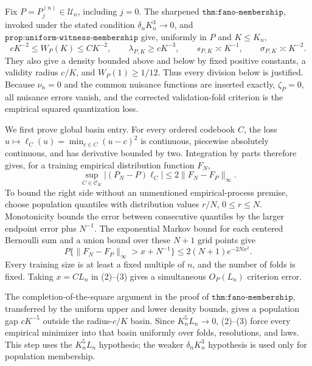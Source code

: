 Fix \(P=P_j^{(n)}\in\mathcal U_n\), including \(j=0\).  The sharpened \(\texttt{thm:fano-membership}\), invoked under the stated condition \(\delta_nK_n^3\to0\), and \(\texttt{prop:uniform-witness-membership}\) give, uniformly in \(P\) and \(K\leq K_n\),
\[
 cK^{-2}\leq W_P(K)\leq CK^{-2},\qquad
 \lambda_{P,K}\geq cK^{-3},\qquad s_{P,K}\asymp K^{-1},
 \qquad \sigma_{P,K}\asymp K^{-2}.                                                       \tag{1}
\]
They also give a density bounded above and below by fixed positive constants, a validity radius \(c/K\), and \(W_P(1)\geq1/12\).  Thus every division below is justified.  Because \(\nu_n=0\) and the common nuisance functions are inserted exactly, \(\zeta_P=0\), all nuisance errors vanish, and the corrected validation-fold criterion is the empirical squared quantization loss.

We first prove global basin entry.  For every ordered codebook \(C\), the loss \(u\mapsto\ell_C(u)=\min_{c\in C}(u-c)^2\) is continuous, piecewise absolutely continuous, and has derivative bounded by two.  Integration by parts therefore gives, for a training empirical distribution function \(F_N\),
\[
 \sup_{C\in\mathcal C_K}|(P_N-P)\ell_C|
 \leq2\|F_N-F_P\|_\infty.                                                              \tag{2}
\]
To bound the right side without an unmentioned empirical-process premise, choose population quantiles with distribution values \(r/N\), \(0\leq r\leq N\).  Monotonicity bounds the error between consecutive quantiles by the larger endpoint error plus \(N^{-1}\).  The exponential Markov bound for each centered Bernoulli sum and a union bound over these \(N+1\) grid points give
\[
 P\{\|F_N-F_P\|_\infty>x+N^{-1}\}\leq2(N+1)e^{-2Nx^2}.                               \tag{3}
\]
Every training size is at least a fixed multiple of \(n\), and the number of folds is fixed.  Taking \(x=CL_n\) in (2)--(3) gives a simultaneous \(O_P(L_n)\) criterion error.

The completion-of-the-square argument in the proof of \(\texttt{thm:fano-membership}\), transferred by the uniform upper and lower density bounds, gives a population gap \(cK^{-5}\) outside the radius-\(c/K\) basin.  Since \(K_n^5L_n\to0\), (2)--(3) force every empirical minimizer into that basin uniformly over folds, resolutions, and laws.  This step uses the \(K_n^5L_n\) hypothesis; the weaker \(\delta_nK_n^3\) hypothesis is used only for population membership.

